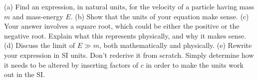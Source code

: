 (a) Find an expression, in natural units, for the velocity of a particle having mass $m$ and mass-energy $E$.\hwendpart
(b) Show that the units of your equation make sense.\hwendpart
(c) Your answer involves a square root, which could be either the positive or the negative root. Explain what this
represents physically, and why it makes sense.\hwendpart
(d) Discuss the limit of $E \gg m$, both mathematically and physically.\hwendpart
(e) Rewrite your expression in SI units. Don't rederive it from scratch. Simply determine how it needs to be
altered by inserting factors of $c$ in order to make the units work out in the SI.

